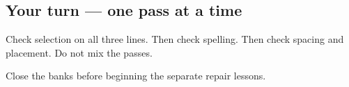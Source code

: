 \subsection*{Your turn — one pass at a time}
Check selection on all three lines. Then check spelling. Then check spacing and placement. Do not mix the passes.

\begin{tcolorbox}[breakable,colback=teal!4,colframe=teal!35!black,title={Before you move on}]
Close the banks before beginning the separate repair lessons.
\end{tcolorbox}
